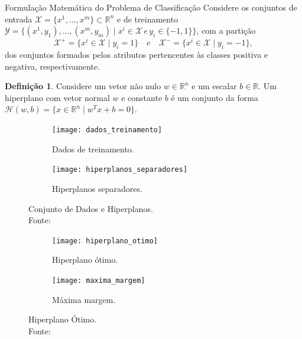 \documentclass{beamer}
\def\Xset{\mathcal{X}}
\def\Yset{\mathcal{Y}}
\def\Hset{\mathcal{H}}
\def\RR{\mathds{R}}
\theoremstyle{definition}%
\newtheorem{defi}{Definição}
\begin{document}
\begin{frame}{Formulação Matemática do Problema de Classificação}
Considere os conjuntos de entrada $\Xset =\{x^1, \ldots , x^m \} \subset \RR^n$ e de treinamento $\Yset=\{(x^1, y_1), \ldots , (x^m, y_m)\mid x^i \in \Xset \, e \, y_i \in \{-1,1\}\}$, com a partição 
\[ \label{conj1}
\Xset ^{+} =\{x^i \in \Xset\mid y_i=1\} \quad e \quad \Xset^{-}=\{x^i \in \Xset\mid y_i=-1\},
\]
dos conjuntos formados pelos atributos pertencentes às classes positiva e negativa, respectivamente.

\begin{defi} Considere um vetor não nulo $w\in \RR^n$ e um escalar $b\in \RR$. Um hiperplano com vetor normal $w$ e constante $b$ é um conjunto da forma $\Hset(w,b)=\{x\in \RR^n \mid w^{T}x+b=0\}$.
\end{defi}
\end{frame}


\begin{frame}
\begin{figure}[h] 
	\centering
	\begin{subfigure}[h]{0.4\textwidth}
		\centering
		\texttt{[image: dados\_treinamento]}
		\caption{Dados de treinamento. \label{fig2:a}}
	\end{subfigure}
	\begin{subfigure}[h]{0.38\textwidth}
		\centering
		\texttt{[image: hiperplanos\_separadores]}
		\caption{Hiperplanos separadores. \label{fig2:b}}
	\end{subfigure}
	\caption{Conjunto de Dados e Hiperplanos. \label{fig2}
		\\ Fonte: \textcite{Evelin2017}}
\end{figure}
\end{frame}


\begin{frame}
\begin{figure}[h] 
	\centering
	\begin{subfigure}[h]{0.4\textwidth}
		\centering
		\texttt{[image: hiperplano\_otimo]}
		\caption{Hiperplano ótimo. \label{fig3:a}}
	\end{subfigure}
	\begin{subfigure}[h]{0.4\textwidth}
		\centering
		\texttt{[image: maxima\_margem]}
		\caption{Máxima margem. \label{fig3:b}}	
	\end{subfigure}
	\caption{Hiperplano Ótimo. \label{fig3}
		\\ Fonte: \textcite{Evelin2017}}
\end{figure}
\end{frame}
\end{document}
